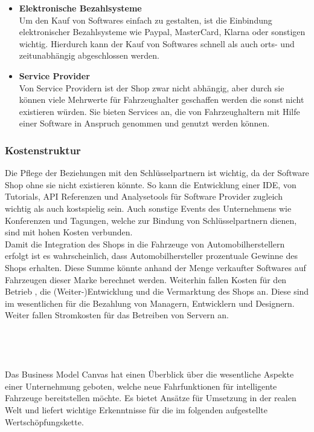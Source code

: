 \begin{itemize}
	\item \textbf{Elektronische Bezahlsysteme}\\
	Um den Kauf von Softwares einfach zu gestalten, ist die Einbindung elektronischer Bezahlsysteme wie Paypal, MasterCard, Klarna oder sonstigen wichtig. Hierdurch kann der Kauf von Softwares schnell als auch orts- und zeitunabhängig abgeschlossen werden.

	\item \textbf{Service Provider}\\
	Von Service Providern ist der Shop zwar nicht abhängig, aber durch sie können viele  Mehrwerte für Fahrzeughalter geschaffen werden die sonst nicht existieren würden. Sie bieten Services an, die von Fahrzeughaltern mit Hilfe einer Software in Anspruch genommen und genutzt werden können.
\end{itemize}

\subsubsection{Kostenstruktur}
Die Pflege der Beziehungen mit den Schlüsselpartnern ist wichtig, da der Software Shop ohne sie nicht existieren könnte. So kann die Entwicklung einer IDE, von Tutorials, API Referenzen und Analysetools für Software Provider zugleich wichtig als auch kostspielig sein. Auch sonstige Events des Unternehmens wie Konferenzen und Tagungen, welche zur Bindung von Schlüsselpartnern dienen, sind mit hohen Kosten verbunden.\\
Damit die Integration des Shops in die Fahrzeuge von Automobilherstellern erfolgt ist es wahrscheinlich, dass Automobilhersteller prozentuale Gewinne des Shops erhalten. Diese Summe könnte anhand der Menge verkaufter Softwares auf Fahrzeugen dieser Marke berechnet werden. Weiterhin fallen Kosten für den Betrieb , die (Weiter-)Entwicklung und die Vermarktung des Shops an. Diese sind im wesentlichen für die Bezahlung von Managern, Entwicklern und Designern. Weiter fallen Stromkosten für das Betreiben von Servern an.\\\\\\\\\\
Das Business Model Canvas hat einen Überblick über die wesentliche Aspekte einer Unternehmung geboten, welche neue Fahrfunktionen für intelligente Fahrzeuge bereitstellen möchte. Es bietet Ansätze für Umsetzung in der realen Welt und liefert wichtige Erkenntnisse für die im folgenden aufgestellte Wertschöpfungskette.